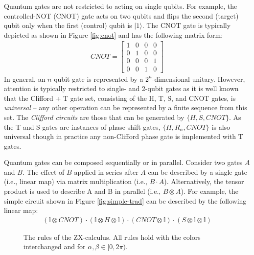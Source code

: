 Quantum gates are not restricted to acting on single qubits.
For example, the controlled-NOT (CNOT) gate acts on two qubits and flips the second (target) qubit only when the first (control) qubit is $|1\rangle$.
The CNOT gate is typically depicted as shown in Figure \ref{fig:cnot} and has the following matrix form:
\begin{align*}
  CNOT = \begin{bmatrix}1 & 0 & 0 & 0 \\0 & 1 & 0 & 0 \\ 0 & 0 & 0 & 1\\0 & 0 & 1 & 0\end{bmatrix}
\end{align*}
In general, an $n$-qubit gate is represented by a $2^n$-dimensional unitary.
However, attention is typically restricted to single- and 2-qubit gates as it is well known that the Clifford + T gate set, consisting of the H, T, S, and CNOT gates, is \emph{universal} -- any other operation can be represented by a finite sequence from this set.
The \emph{Clifford circuits} are those that can be generated by $\{H, S, CNOT\}$.
As the T and S gates are instances of phase shift gates, $\{H, R_{\alpha}, CNOT\}$ is also universal though in practice any non-Clifford phase gate is implemented with T gates. %

Quantum gates can be composed sequentially or in parallel.
Consider two gates $A$ and $B$.
The effect of $B$ applied in series after $A$ can be described by a single gate (i.e., linear map) via matrix multiplication (i.e., $B \cdot A$).
Alternatively, the tensor product is used to describe A and B in parallel (i.e., $B \otimes A$).
For example, the simple circuit shown in Figure \ref{fig:simple-trad} can be described by the following linear map:
\begin{align*}
  (\mathbb{I} \otimes CNOT) \cdot (\mathbb{I} \otimes H \otimes \mathbb{I}) \cdot (CNOT \otimes \mathbb{I}) \cdot (S \otimes \mathbb{I} \otimes \mathbb{I})
\end{align*}



\begin{figure}
\centering
{}
\caption{
  The rules of the ZX-calculus.
  All rules hold with the colors interchanged and for $\alpha, \beta \in [0, 2 \pi)$.}
\label{fig:zx-rules}
\end{figure}



